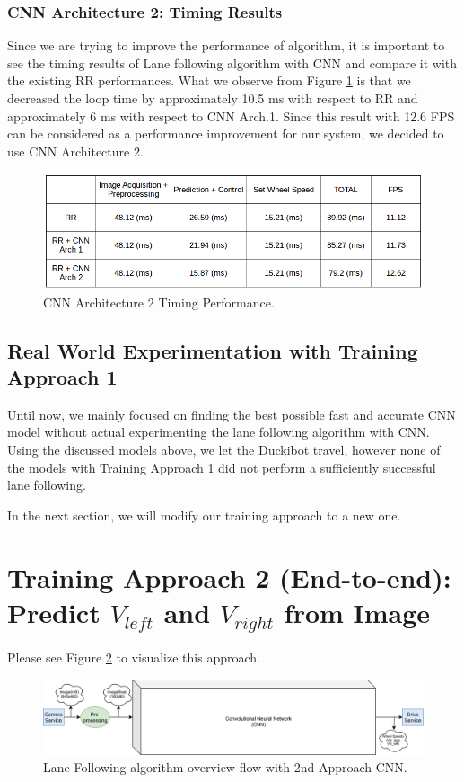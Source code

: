 \documentclass[11pt,letterpaper]{article}
\begin{document}
	\subsubsection{CNN Architecture 2: Timing Results}
	Since we are trying to improve the performance of algorithm, it is important to see the timing results of Lane following algorithm with CNN and compare it with the existing RR performances. What we observe from Figure \ref{fig:10} is that we decreased the loop time by approximately 10.5 ms with respect to RR and approximately 6 ms with respect to CNN Arch.1. Since this result with 12.6 FPS can be considered as a performance improvement for our system, we decided to use CNN Architecture 2.
	
	\begin{figure}[h!]
		\centering
		\includegraphics[width=0.7\linewidth]{time-arc2.png}
		\caption{CNN Architecture 2 Timing Performance.}
		\label{fig:10}
	\end{figure}
	
	\subsection{Real World Experimentation with Training Approach 1}
	Until now, we mainly focused on finding the best possible fast and accurate CNN model without actual experimenting the lane following algorithm with CNN. Using the discussed models above, we let the Duckibot travel, however none of the models with Training Approach 1 did not perform a sufficiently successful lane following.
	
	In the next section, we will modify our training approach to a new one.
	
	\section{Training Approach 2 (End-to-end): Predict $V_{left}$ and $V_{right}$ from Image}
	Please see Figure \ref{fig:11} to visualize this approach.  
	
	\begin{figure}[h!]
		\centering
		\includegraphics[width=1.1\linewidth]{algo2.png}
		\caption{Lane Following algorithm overview flow with 2nd Approach CNN.}
		\label{fig:11}
	\end{figure}
	
\end{document}
